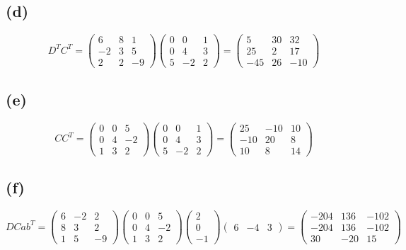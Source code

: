 \documentclass[fleqn, letterpaper]{tufte-handout}
\begin{document}
\subsection{(d)}
\[
D^TC^T =
\left(\begin{array}{ccc} 6 & 8 & 1\\ -2 & 3 & 5\\ 2 & 2 & -9 \end{array}\right)
\left(\begin{array}{ccc} 0 & 0 & 1\\ 0 & 4 & 3\\ 5 & -2 & 2 \end{array}\right)
=\left(\begin{array}{ccc} 5 & 30 & 32\\ 25 & 2 & 17\\ -45 & 26 & -10 \end{array}\right)
\]
\subsection{(e)}
\[
CC^T=
\left(\begin{array}{ccc} 0 & 0 & 5\\ 0 & 4 & -2\\ 1 & 3 & 2 \end{array}\right)
\left(\begin{array}{ccc} 0 & 0 & 1\\ 0 & 4 & 3\\ 5 & -2 & 2 \end{array}\right)
=\left(\begin{array}{ccc} 25 & -10 & 10\\ -10 & 20 & 8\\ 10 & 8 & 14 \end{array}\right)
\]
\subsection{(f)}
\[
DCab^T=
\left(\begin{array}{ccc} 6 & -2 & 2\\ 8 & 3 & 2\\ 1 & 5 & -9 \end{array}\right)
\left(\begin{array}{ccc} 0 & 0 & 5\\ 0 & 4 & -2\\ 1 & 3 & 2 \end{array}\right)
\left(\begin{array}{c} 2\\ 0\\ -1 \end{array}\right)
\left(\begin{array}{ccc} 6 & -4 & 3 \end{array}\right)
= \left(\begin{array}{ccc} -204 & 136 & -102\\ -204 & 136 & -102\\ 30 & -20 & 15 \end{array}\right)
\]
\end{document}
